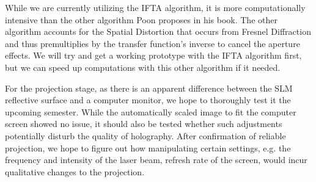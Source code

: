 \documentclass[12pt]{article}
\begin{document}
While we are currently utilizing the IFTA algorithm, it is more computationally intensive than the other algorithm Poon proposes in his book. The other algorithm accounts for the Spatial Distortion that occurs from Fresnel Diffraction and thus premultiplies by the transfer function's inverse to cancel the aperture effects. We will try and get a working prototype with the IFTA algorithm first, but we can speed up computations with this other algorithm if it needed.

For the projection stage, as there is an apparent difference between the SLM reflective surface and a computer monitor, we hope to thoroughly test it the upcoming semester. While the automatically scaled image to fit the computer screen showed no issue, it should also be tested whether such adjustments potentially disturb the quality of holography. After confirmation of reliable projection, we hope to figure out how manipulating certain settings, e.g. the frequency and intensity of the laser beam, refresh rate of the screen, would incur qualitative changes to the projection. 



\end{document}
